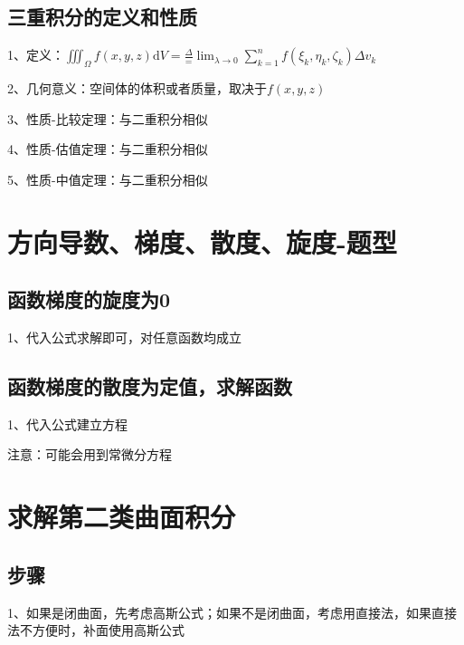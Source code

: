 \subsection{三重积分的定义和性质}

1、定义：$ \iiint_{\Omega} f(x, y,z) \mathrm{d} V=\frac{\Delta}{=} \lim _{\lambda \rightarrow 0} \sum_{k=1}^{n} f\left(\xi_{k}, \eta_{k},\zeta_{k} \right) \Delta v_{k} $

2、几何意义：空间体的体积或者质量，取决于$ f(x, y,z)  $

3、性质-比较定理：与二重积分相似

4、性质-估值定理：与二重积分相似

5、性质-中值定理：与二重积分相似

\section{方向导数、梯度、散度、旋度-题型}



\subsection{函数梯度的旋度为0}

1、代入公式求解即可，对任意函数均成立



\subsection{函数梯度的散度为定值，求解函数}

1、代入公式建立方程

注意：可能会用到常微分方程



\section{求解第二类曲面积分}



\subsection{步骤}

1、如果是闭曲面，先考虑高斯公式；如果不是闭曲面，考虑用直接法，如果直接法不方便时，补面使用高斯公式



